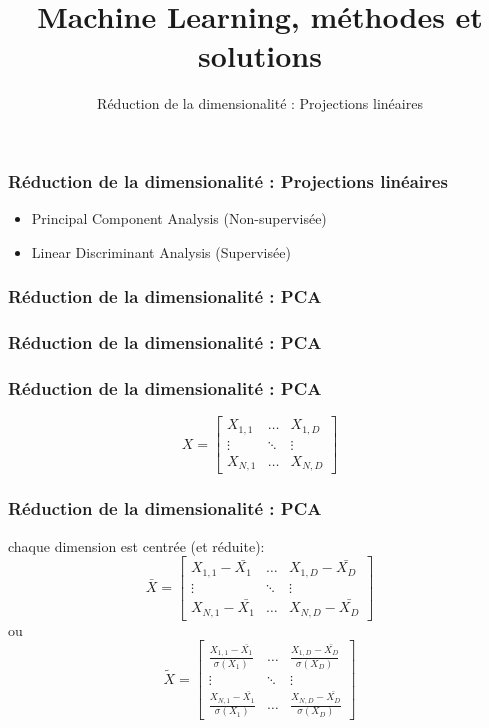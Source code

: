 \documentclass{formation}
\title{Machine Learning, méthodes et solutions}
\subtitle{Réduction de la dimensionalité : Projections linéaires}
\begin{document}
\maketitle

\begin{frame}
  \frametitle{Réduction de la dimensionalité : Projections linéaires}
    \begin{itemize}
    \item Principal Component Analysis (Non-supervisée)
    \item Linear Discriminant Analysis (Supervisée)
    \end{itemize}
\end{frame}

\begin{frame}
  \frametitle{Réduction de la dimensionalité : PCA}
\end{frame}

\begin{frame}
  \frametitle{Réduction de la dimensionalité : PCA}
\end{frame}

\begin{frame}
  \frametitle{Réduction de la dimensionalité : PCA}
  \[
  X = \begin{bmatrix}
    X_{1,1} & \dots  & X_{1,D} \\
    \vdots & \ddots & \vdots \\
    X_{N,1} & \dots  & X_{N,D}
  \end{bmatrix}
  \]
\end{frame}

\begin{frame}
  \frametitle{Réduction de la dimensionalité : PCA}
  chaque dimension est centrée (et réduite):
  \[
  \bar{X} =
  \begin{bmatrix}
    X_{1,1}-\bar{X_1} & \dots  & X_{1,D}-\bar{X_D} \\
    \vdots & \ddots & \vdots \\
    X_{N,1}-\bar{X_1} & \dots  & X_{N,D}-\bar{X_D}
  \end{bmatrix}
  \]
  ou
  \[
  \tilde{X} =
  \begin{bmatrix}
    \frac{X_{1,1}-\bar{X_1}}{\sigma(X_1)} & \dots  & \frac{X_{1,D}-\bar{X_D}}{\sigma(X_D)} \\
    \vdots & \ddots & \vdots \\
    \frac{X_{N,1}-\bar{X_1}}{\sigma(X_1)} & \dots  & \frac{X_{N,D}-\bar{X_D}}{\sigma(X_D)}
  \end{bmatrix}
  \]
\end{frame}
\end{document}
